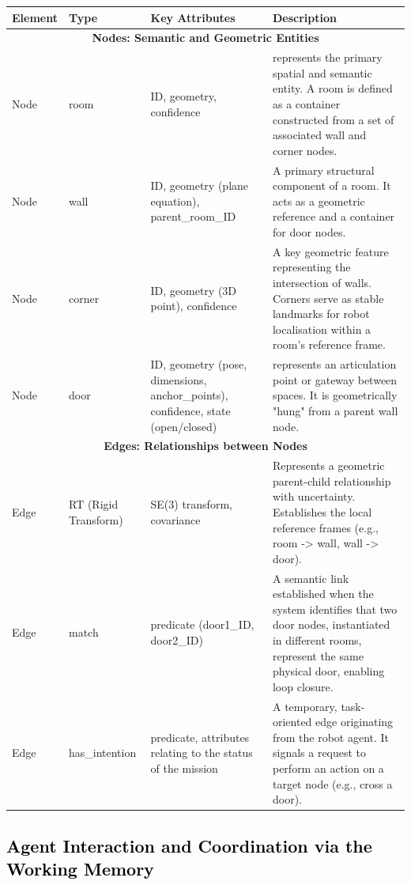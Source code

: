 \documentclass[10pt,a4paper]{article}
\begin{document}
\begin{table}[h]
\begin{tabular}{|p{1.6cm}|p{1.8cm}|p{3cm}|p{6cm}|}
\hline
\textbf{Element} & \textbf{Type} & \textbf{Key Attributes} & \textbf{Description} \\
\hline
\multicolumn{4}{|c|}{\textbf{Nodes: Semantic and Geometric Entities}} \\
\hline
Node & room & ID, geometry, confidence & represents the primary spatial and semantic entity. A room is defined as a container constructed from a set of associated wall and corner nodes. \\
\hline
Node & wall & ID, geometry (plane equation), parent\_room\_ID & A primary structural component of a room. It acts as a geometric reference and a container for door nodes. \\
\hline
Node & corner & ID, geometry (3D point), confidence & A key geometric feature representing the intersection of walls. Corners serve as stable landmarks for robot localisation within a room's reference frame. \\
\hline
Node & door & ID, geometry (pose, dimensions, anchor\_points), confidence, state (open/closed) & represents an articulation point or gateway between spaces. It is geometrically "hung" from a parent wall node. \\
\hline
\multicolumn{4}{|c|}{\textbf{Edges: Relationships between Nodes}} \\
\hline
Edge & RT (Rigid Transform) & SE(3) transform, covariance & Represents a geometric parent-child relationship with uncertainty. Establishes the local reference frames (e.g., room -> wall, wall -> door). \\
\hline
Edge & match & predicate (door1\_ID, door2\_ID) & A semantic link established when the system identifies that two door nodes, instantiated in different rooms, represent the same physical door, enabling loop closure. \\
\hline
Edge & has\_intention & predicate, attributes relating to the status of the mission & A temporary, task-oriented edge originating from the robot agent. It signals a request to perform an action on a target node (e.g., cross a door). \\
\hline
\end{tabular}
\end{table}


\subsection{\textcolor{black}{Agent Interaction and Coordination via the Working Memory}}
\end{document}
